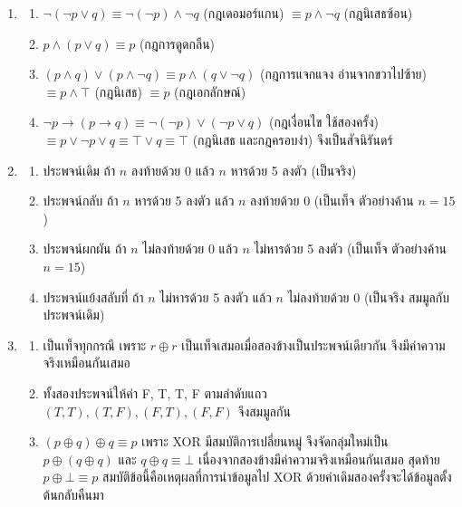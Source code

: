\begin{enumerate}[label={},leftmargin=1.5em]
    \item
    \begin{enumerate}[label=\textbf{\thechapter.\arabic{enumi}.\arabic*}]
        \item $\neg(\neg p \lor q) \equiv \neg(\neg p) \land \neg q$ (กฎเดอมอร์แกน) $\equiv p \land \neg q$ (กฎนิเสธซ้อน)
        \item $p \land (p \lor q) \equiv p$ (กฎการดูดกลืน)
        \item $(p \land q) \lor (p \land \neg q) \equiv p \land (q \lor \neg q)$ (กฎการแจกแจง อ่านจากขวาไปซ้าย) $\equiv p \land \top$ (กฎนิเสธ) $\equiv p$ (กฎเอกลักษณ์)
        \item $\neg p \rightarrow (p \rightarrow q) \equiv \neg(\neg p) \lor (\neg p \lor q)$ (กฎเงื่อนไข ใช้สองครั้ง) $\equiv p \lor \neg p \lor q \equiv \top \lor q \equiv \top$ (กฎนิเสธ และกฎครอบงำ) จึงเป็นสัจนิรันดร์
    \end{enumerate}

    \item
    \begin{enumerate}[label=\textbf{\thechapter.\arabic{enumi}.\arabic*}]
        \item ประพจน์เดิม ถ้า $n$ ลงท้ายด้วย 0 แล้ว $n$ หารด้วย 5 ลงตัว (เป็นจริง)
        \item ประพจน์กลับ ถ้า $n$ หารด้วย 5 ลงตัว แล้ว $n$ ลงท้ายด้วย 0 (เป็นเท็จ ตัวอย่างค้าน $n=15$)
        \item ประพจน์ผกผัน ถ้า $n$ ไม่ลงท้ายด้วย 0 แล้ว $n$ ไม่หารด้วย 5 ลงตัว (เป็นเท็จ ตัวอย่างค้าน $n=15$)
        \item ประพจน์แย้งสลับที่ ถ้า $n$ ไม่หารด้วย 5 ลงตัว แล้ว $n$ ไม่ลงท้ายด้วย 0 (เป็นจริง สมมูลกับประพจน์เดิม)
    \end{enumerate}

    \item
    \begin{enumerate}[label=\textbf{\thechapter.\arabic{enumi}.\arabic*}]
        \item เป็นเท็จทุกกรณี เพราะ $r \oplus r$ เป็นเท็จเสมอเมื่อสองข้างเป็นประพจน์เดียวกัน จึงมีค่าความจริงเหมือนกันเสมอ
        \item ทั้งสองประพจน์ให้ค่า F, T, T, F ตามลำดับแถว $(T,T), (T,F), (F,T), (F,F)$ จึงสมมูลกัน
        \item $(p \oplus q) \oplus q \equiv p$ เพราะ XOR มีสมบัติการเปลี่ยนหมู่ จึงจัดกลุ่มใหม่เป็น $p \oplus (q \oplus q)$ และ $q \oplus q \equiv \bot$ เนื่องจากสองข้างมีค่าความจริงเหมือนกันเสมอ สุดท้าย $p \oplus \bot \equiv p$ สมบัติข้อนี้คือเหตุผลที่การนำข้อมูลไป XOR ด้วยค่าเดิมสองครั้งจะได้ข้อมูลตั้งต้นกลับคืนมา
    \end{enumerate}


\end{enumerate}
